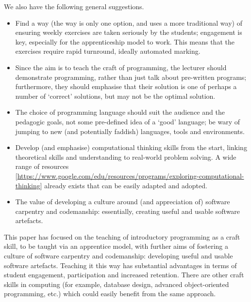 \documentclass[conference,compsoc]{IEEEtran}
\begin{document}
We also have the following general suggestions.
\begin{itemize}
	\item	Find a way (the \BathM{} way is only one option, and \BathC{} uses a more traditional way) of ensuring weekly exercises are taken seriously by the students; engagement is key, especially for the apprenticeship model to work. This means that the exercises require rapid turnround, ideally automated marking.
	\item	Since the aim is to teach the craft of programming, the lecturer should demonstrate programming, rather than just talk about pre-written programs; furthermore, they should emphasise that their solution is one of perhaps a number of `correct' solutions, but may not be the optimal solution.
	\item	The choice of programming language should suit the audience and the pedagogic goals, not some pre-defined idea of a `good' language; be wary of jumping to new (and potentially faddish) languages, tools and environments.
	\item	Develop (and emphasise) computational thinking skills from the start, linking theoretical skills and understanding to real-world problem solving. A wide range of resources [\url{https://www.google.com/edu/resources/programs/exploring-computational-thinking}] already exists that can be easily adapted and adopted.
	\item	The value of developing a culture around (and appreciation of) software carpentry and codemanship: essentially, creating useful and usable software artefacts.
\end{itemize} 

This paper has focused on the teaching of introductory programming as a craft skill, to be taught via an apprentice model, with further aims of fostering a culture of software carpentry and codemanship: developing useful and usable software artefacts. Teaching it this way has substantial advantages in terms of student engagement, participation and increased retention. There are other craft skills in computing (for example, database design, advanced object-oriented programming, etc.) which could easily benefit from the same approach.
\end{document}

